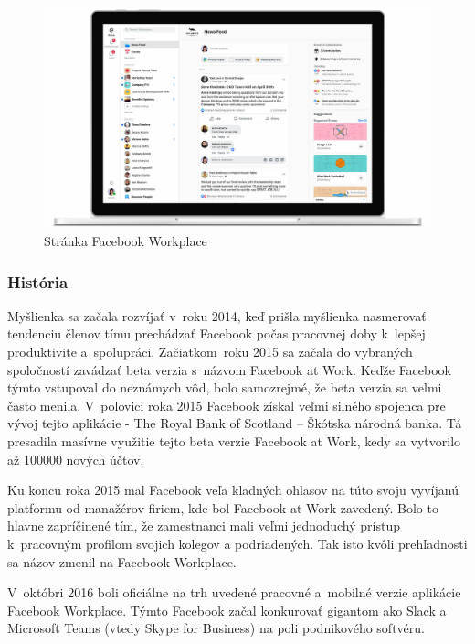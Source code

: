 \begin{figure}[H]
    \centering
    \includegraphics[scale=0.25]{img/obr-fb-workplace.jpg}
    \caption{Stránka Facebook Workplace\cite{facebook_workplace_2}}
    \label{fig:img-fb-workplace}
\end{figure}

\subsubsection{História}
\indent Myšlienka sa začala rozvíjať v roku 2014, keď prišla myšlienka nasmerovať tendenciu členov tímu prechádzať Facebook počas pracovnej doby k lepšej produktivite a spolupráci. Začiatkom roku 2015 sa začala do vybraných spoločností zavádzať beta verzia s názvom Facebook at Work. Keďže Facebook týmto vstupoval do neznámych vôd, bolo samozrejmé, že beta verzia sa veľmi často menila. V polovici roka 2015 Facebook získal veľmi silného spojenca pre vývoj tejto aplikácie - The Royal Bank of Scotland – Škótska národná banka. Tá presadila masívne využitie tejto beta verzie Facebook at Work, kedy sa vytvorilo až 100000 nových účtov. 

\indent Ku koncu roka 2015 mal Facebook veľa kladných ohlasov na túto svoju vyvíjanú platformu od manažérov firiem, kde bol Facebook at Work zavedený. Bolo to hlavne zapríčinené tím, že zamestnanci mali veľmi jednoduchý prístup k pracovným profilom svojich kolegov a podriadených. Tak isto kvôli prehľadnosti sa názov zmenil na Facebook Workplace.

\indent  V októbri 2016 boli oficiálne na trh uvedené pracovné a mobilné verzie aplikácie Facebook Workplace. Týmto Facebook začal konkurovať gigantom ako Slack a Microsoft Teams (vtedy Skype for Business) na poli podnikového softvéru\cite{facebook_workplace,facebook_workplace_2}.
